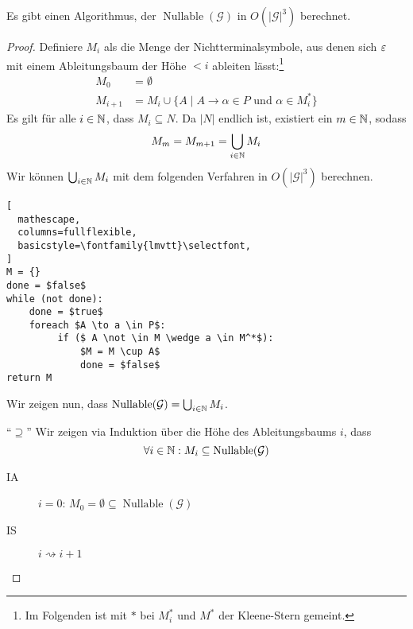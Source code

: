 \begin{Satz}\label{satz:3.nullable}
  Es gibt einen Algorithmus, der $\operatorname{Nullable}(\mathcal{G})$ in $O(|\mathcal{G}|^3)$ berechnet.
\end{Satz}
\begin{proof}
  Definiere $M_i$ als die Menge der Nichtterminalsymbole, aus denen sich
  $\varepsilon$ mit einem Ableitungsbaum der Höhe $< i$ ableiten lässt:\footnote{
  Im Folgenden ist mit $*$ bei $M_i^*$ und $M^*$ der Kleene-Stern gemeint.} 
  \begin{align*}
    M_0 &= \emptyset \\
    M_{i+1} &= M_i \cup \{ A \mid A \to \alpha \in P \text{ und }
              \alpha \in M_i^* \}
  \end{align*}
  Es gilt für alle $i \in \mathbb{N}$, dass $M_i \subseteq N$.
  Da $|N|$ endlich ist, existiert ein $m \in \mathbb{N}$, sodass
  \begin{displaymath}
    M_m = M_{m+1} = \bigcup_{i \in \mathbb{N}} M_i
  \end{displaymath}
  Wir können $\bigcup_{i \in \mathbb{N}} M_i$ mit dem folgenden Verfahren in $O(|\mathcal{G}|^3)$ berechnen.
  
  \begin{center}
  \begin{minipage}{7cm}
  \begin{lstlisting}[
  mathescape,
  columns=fullflexible,
  basicstyle=\fontfamily{lmvtt}\selectfont,
]
M = {}
done = $false$
while (not done):
    done = $true$
    foreach $A \to a \in P$:
         if ($ A \not \in M \wedge a \in M^*$):
             $M = M \cup A$
             done = $false$
return M
\end{lstlisting}
\end{minipage}
\end{center}

  Wir zeigen nun, dass $\operatorname{Nullable}(\mathcal{G}) = \bigcup_{i \in \mathbb{N}} M_i$.

  \medskip
  
  "`$\supseteq$"'\quad
  Wir zeigen via Induktion über die Höhe des Ableitungsbaums $i$, dass 
  $$\forall i \in \mathbb{N}: M_i \subseteq \operatorname{Nullable}(\mathcal{G})$$
  \begin{description}
  \item[IA] $i = 0$: $M_0 = \emptyset \subseteq \operatorname{Nullable}(\mathcal{G})$
  \item[IS] $i \rightsquigarrow i+1$


\end{description}
\end{proof}
